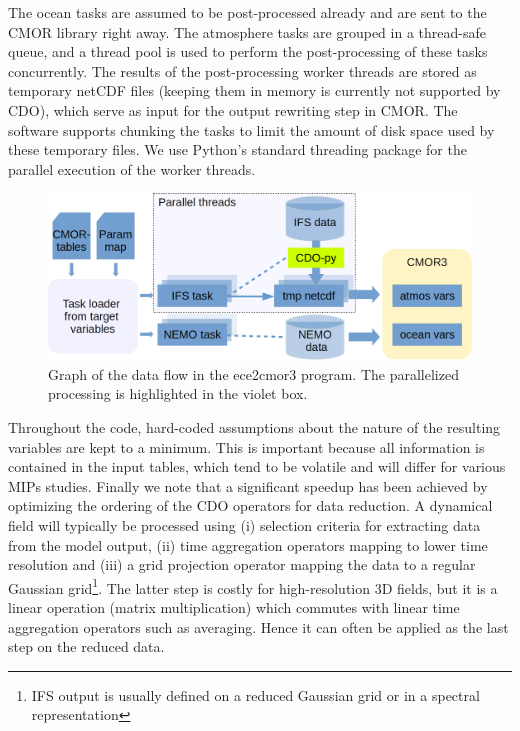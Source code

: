 \documentclass[procedia]{easychair}
\begin{document}
The ocean tasks are assumed to be post-processed already and are sent to the 
CMOR library right away. The atmosphere tasks are grouped in a thread-safe 
queue, and a thread pool is used to perform the post-processing of these 
tasks concurrently. The results of the post-processing worker threads are 
stored as temporary netCDF files (keeping them in memory is currently not 
supported by CDO), which serve as input for the output rewriting step in CMOR. 
The software supports chunking the tasks to limit the amount of disk space used 
by these temporary files. We use Python's standard threading package for the 
parallel execution of the worker threads.

\begin{figure}[ht]
 \centering
 \includegraphics[width=\textwidth,clip]{ece2cmor3flowv3.png}
 \caption{Graph of the data flow in the ece2cmor3 program. The parallelized 
processing is highlighted in the violet box.}
\label{fig:design}
\end{figure}

Throughout the code, hard-coded assumptions about the nature of the resulting 
variables are kept to a minimum. This is important because all information is 
contained in the input tables, which tend to be volatile and will differ for 
various MIPs studies. Finally we note that a significant speedup has 
been achieved by optimizing the ordering of the CDO operators for data 
reduction. A dynamical field will typically be processed using (i) selection 
criteria for extracting data from the model output, (ii) time aggregation 
operators mapping to lower time resolution and (iii) a grid projection operator 
mapping the data to a regular Gaussian grid\footnote{IFS output is usually 
defined on a reduced Gaussian grid or in a spectral representation}. The latter 
step is costly for high-resolution 3D fields, but it is a linear operation 
(matrix multiplication) which commutes with linear time aggregation operators 
such as averaging. Hence it can often be applied as the last step on the 
reduced data.
\end{document}
